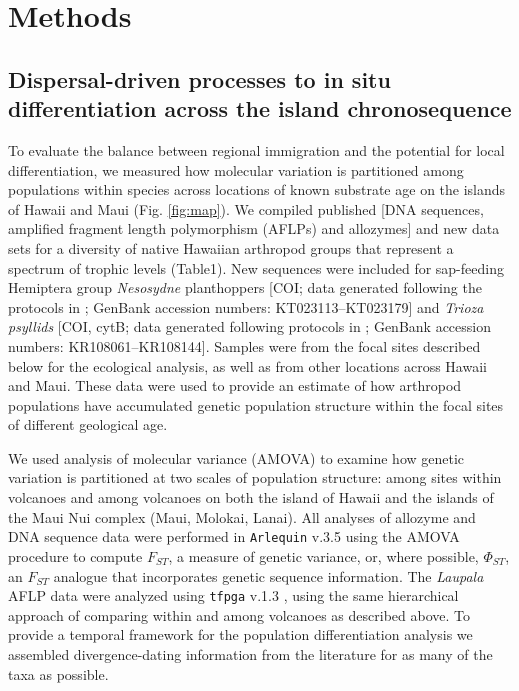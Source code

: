 \section{Methods}

\subsection{Dispersal-driven processes to in situ differentiation
across the island chronosequence}

To evaluate the balance between regional immigration and the potential
for local differentiation, we measured how molecular variation is
partitioned among populations within species across locations of known
substrate age on the islands of Hawaii and Maui (Fig. \ref{fig:map}). We compiled
published [DNA sequences, amplified fragment length polymorphism
(AFLPs) and allozymes] and new data sets for a diversity of native
Hawaiian arthropod groups that represent a spectrum of trophic levels
(Table1). New sequences were included for sap-feeding Hemiptera group
\textit{Nesosydne} planthoppers [COI; data generated following the
protocols in \citet{goodman2012}; GenBank accession numbers:
KT023113--KT023179] and \textit{Trioza psyllids} [COI, cytB; data
generated following protocols in \citet{percy2003}; GenBank accession
numbers: KR108061–KR108144]. Samples were from the focal sites
described below for the ecological analysis, as well as from other
locations across Hawaii and Maui. These data were used to provide an
estimate of how arthropod populations have accumulated genetic
population structure within the focal sites of different geological
age.

We used analysis of molecular variance (AMOVA) to examine how genetic
variation is partitioned at two scales of population structure: among
sites within volcanoes and among volcanoes on both the island of
Hawaii and the islands of the Maui Nui complex (Maui, Molokai,
Lanai). All analyses of allozyme and DNA sequence data were performed
in \texttt{Arlequin} v.3.5 \citep{arlequin} using the AMOVA procedure
to compute $F_{ST}$, a measure of genetic variance, or, where
possible, $\Phi_{ST}$, an $F_{ST}$ analogue that incorporates genetic
sequence information. The \textit{Laupala} AFLP data were analyzed
using \texttt{tfpga} v.1.3 \citep{miller1997}, using the same hierarchical
approach of comparing within and among volcanoes as described
above. To provide a temporal framework for the population
differentiation analysis we assembled divergence-dating information
from the literature for as many of the taxa as possible.

